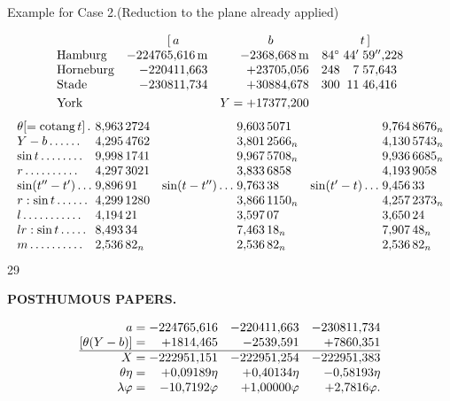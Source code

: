 \medskip
{\centering Example for Case 2.\quad (Reduction to the plane already applied)\par}
\[
\begin{array}{@{}l@{\quad}r@{\quad}r@{\quad}r@{\;}r@{\;}l@{}}
 &\multicolumn{1}{c}{[\,a}&\multicolumn{1}{c}{b}
 &\multicolumn{3}{c@{}}{t\,]}\\
 \text{Hamburg}&-224765{,}616\,\mathrm{m}&-2368{,}668\,\mathrm{m}&84^\circ&44'&59''{,}228\\
 \text{Horneburg}&-220411{,}663&+23705{,}056&248&7&57{,}643\\
 \text{Stade}&-230811{,}734&+30884{,}678&300&11&46{,}416\\[3pt]
 \text{York}&&Y=+17377{,}200&&&
\end{array}
\]
\[
\resizebox{\linewidth}{!}{\(\begin{array}{@{}l@{\;}l@{\quad}r@{\;}l@{\quad}r@{\;}l@{}}
 \theta[=\operatorname{cotang}t]\,.&8{,}963\,2724&&9{,}603\,5071&&9{,}764\,8676_{n}\\
 Y-b\,.\,.\,.\,.\,.\,.&4{,}295\,4762&&3{,}801\,2566_{n}&&4{,}130\,5743_{n}\\
 \sin t\,.\,.\,.\,.\,.\,.\,.\,.&9{,}998\,1741&&9{,}967\,5708_{n}&&9{,}936\,6685_{n}\\
 r\,.\,.\,.\,.\,.\,.\,.\,.\,.\,.&4{,}297\,3021&&3{,}833\,6858&&4{,}193\,9058\\
 \sin(t''-t')\,.\,.\,.&9{,}896\,91&\sin(t-t'')\,.\,.\,.&9{,}763\,38&\sin(t'-t)\,.\,.\,.&9{,}456\,33\\
 r:\sin t\,.\,.\,.\,.\,.\,.&4{,}299\,1280&&3{,}866\,1150_{n}&&4{,}257\,2373_{n}\\
 l\,.\,.\,.\,.\,.\,.\,.\,.\,.\,.\,.&4{,}194\,21&&3{,}597\,07&&3{,}650\,24\\
 lr:\sin t\,.\,.\,.\,.\,.&8{,}493\,34&&7{,}463\,18_{n}&&7{,}907\,48_{n}\\
 m\,.\,.\,.\,.\,.\,.\,.\,.\,.\,.&2{,}536\,82_{n}&&2{,}536\,82_{n}&&2{,}536\,82_{n}
\end{array}\)}
\]
\hfill{\small 29}\hspace*{.12\linewidth}\par

\par\clearpage
\noindent{}\hfill{\small\textbf{POSTHUMOUS PAPERS.}}\hfill\null\par\medskip

\[
\begin{array}{@{}r@{\;}r@{\quad}r@{\quad}r@{}}
 a=&-224765{,}616&-220411{,}663&-230811{,}734\\
 {[}\theta(Y-b)]=&+1814{,}465&-2539{,}591&+7860{,}351\\
 \hline
 X=&-222951{,}151&-222951{,}254&-222951{,}383\\
 \theta\eta=&+0{,}09189\eta&+0{,}40134\eta&-0{,}58193\eta\\
 \lambda\varphi=&-10{,}7192\varphi&+1{,}00000\varphi&+2{,}7816\varphi.
\end{array}
\]

